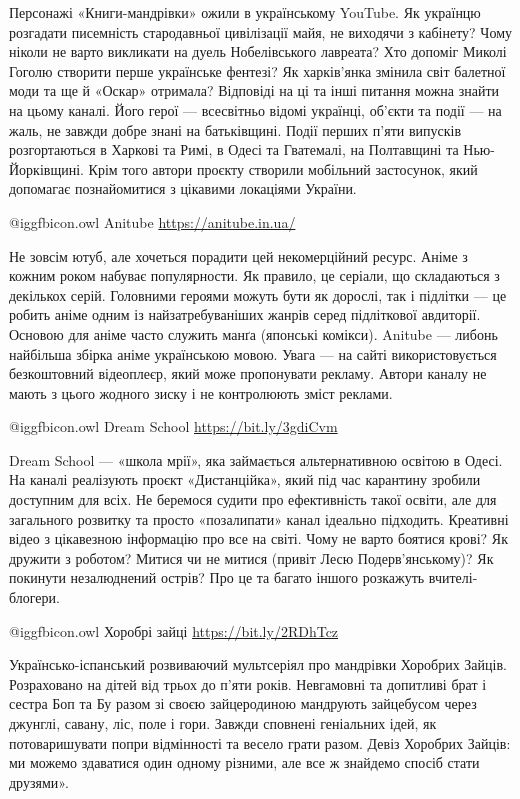 Персонажі «Книги-мандрівки» ожили в українському YouTube. Як українцю розгадати
писемність стародавньої цивілізації майя, не виходячи з кабінету? Чому ніколи
не варто викликати на дуель Нобелівського лавреата? Хто допоміг Миколі Гоголю
створити перше українське фентезі? Як харків’янка змінила світ балетної моди та
ще й «Оскар» отримала? Відповіді на ці та інші питання можна знайти на цьому
каналі. Його герої — всесвітньо відомі українці, об’єкти та події — на жаль, не
завжди добре знані на батьківщині. Події перших п’яти випусків розгортаються в
Харкові та Римі, в Одесі та Гватемалі, на Полтавщині та Нью-Йорківщині. Крім
того автори проєкту створили мобільний застосунок, який допомагає познайомитися
з цікавими локаціями України.

 @igg{fbicon.owl} Anitube \url{https://anitube.in.ua/}

Не зовсім ютуб, але хочеться порадити цей некомерційний ресурс. Аніме з кожним
роком набуває популярности. Як правило, це серіали, що складаються з декількох
серій. Головними героями можуть бути як дорослі, так і підлітки — це робить
аніме одним із найзатребуваніших жанрів серед підліткової авдиторії. Основою
для аніме часто служить манґа (японські комікси). Anitube — либонь найбільша
збірка аніме українською мовою. Увага — на сайті використовується безкоштовний
відеоплеєр, який може пропонувати рекламу. Автори каналу не мають з цього
жодного зиску і не контролюють зміст реклами.

 @igg{fbicon.owl} Dream School \url{https://bit.ly/3gdiCvm}

Dream School — «школа мрії», яка займається альтернативною освітою в Одесі. На
каналі реалізують проєкт «Дистанційка», який під час карантину зробили
доступним для всіх. Не беремося судити про ефективність такої освіти, але для
загального розвитку та просто «позалипати» канал ідеально підходить. Креативні
відео з цікавезною інформацію про все на світі. Чому не варто боятися крові? Як
дружити з роботом? Митися чи не митися (привіт Лесю Подерв’янському)? Як
покинути незалюднений острів? Про це та багато іншого розкажуть
вчителі-блогери.

 @igg{fbicon.owl} Хоробрі зайці \url{https://bit.ly/2RDhTcz}

Українсько-іспанський розвиваючий мультсеріял про мандрівки Хоробрих Зайців.
Розраховано на дітей від трьох до п’яти років. Невгамовні та допитливі брат і
сестра Боп та Бу разом зі своєю зайцеродиною мандрують зайцебусом через
джунглі, савану, ліс, поле і гори. Завжди сповнені геніальних ідей, як
потоваришувати попри відмінності та весело грати разом. Девіз Хоробрих Зайців:
ми можемо здаватися один одному різними, але все ж знайдемо спосіб стати
друзями».

